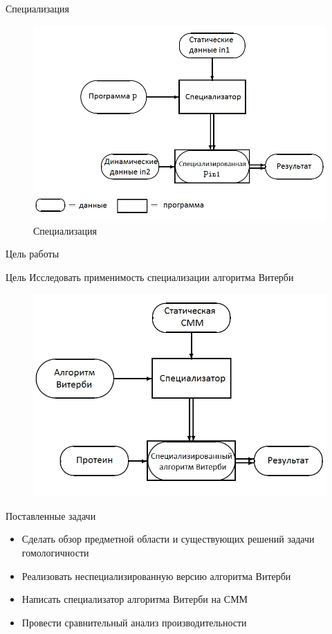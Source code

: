 \documentclass[hyperref={pdfpagelabels=false}]{beamer}
\begin{document}
\begin{frame}{Специализация}
\begin{figure}
	\includegraphics[scale=0.45]{spec.png}
	\caption{Специализация}
\end{figure}
\end{frame} 


\begin{frame}{Цель работы}
\begin{block}{Цель}
Исследовать применимость специализации алгоритма Витерби
\end{block}
\vfill
\begin{figure}
	\includegraphics[scale=0.40]{spec_Viterbi.png}
\end{figure}
\end{frame}


\begin{frame}{Поставленные задачи}
\begin{itemize}
	\item Сделать обзор предметной области и существующих решений 
		задачи гомологичности
	\vfill
	\item Реализовать неспециализированную версию алгоритма Витерби
	\vfill
	\item Написать специализатор алгоритма Витерби на СММ
	\vfill
	\item Провести сравнительный анализ производительности
\end{itemize}
\end{frame}
\end{document}
